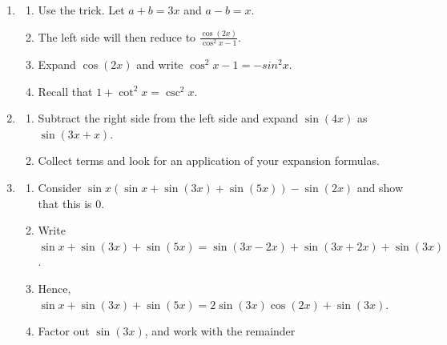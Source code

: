 \documentclass[english]{book}
\begin{document}
\begin{enumerate}
\begin{enumerate}
\begin{enumerate}[\hspace{1cm}a)]
                   I'm sure you are aware that the hints I've given you on these problems do \emph{not} in any way suggest that these are the only ways to solve them. In fact, in many cases my way may be much more complicated and obscure compared to the way you have done it. It has been my experience that, if I find an easy and elegant way to work a problem, it is only after having found the most difficult way possible first.
              \end{enumerate}
        \item \begin{enumerate}[\hspace{1cm}a)]
                \item Use the trick. Let $a+b=3x$ and $a-b=x$.
                \item The left side will then reduce to $\frac{\cos(2x)}{\cos^{2}x-1}$.
                \item Expand $\cos(2x)$ and write $\cos^{2} x - 1 = -sin^{2} x$.
                \item Recall that $1 + \cot^{2} x = \csc^{2} x$.
              \end{enumerate}
        \item \begin{enumerate}[\hspace{1cm}a)]
                \item Subtract the right side from the left side and expand $\sin(4x)$ as $\sin(3x+x)$.
                \item Collect terms and look for an application of your expansion formulas.
              \end{enumerate}
        \item \begin{enumerate}[\hspace{1cm}a)]
                \item Consider $\sin x (\sin x + \sin(3x) + \sin(5x) ) - \sin(2x)$ and show that this is $0$.
                \item Write $\sin x+\sin(3x)+\sin(5x)=\sin(3x-2x)+\sin(3x+2x)+\sin(3x)$.
                \item Hence, $\sin x+\sin(3x)+\sin(5x) = 2\sin(3x)\cos(2x)+\sin(3x)$.
                \item Factor out $\sin(3x)$, and work with the remainder 


\end{enumerate}
\end{enumerate}
\end{enumerate}
\end{document}
